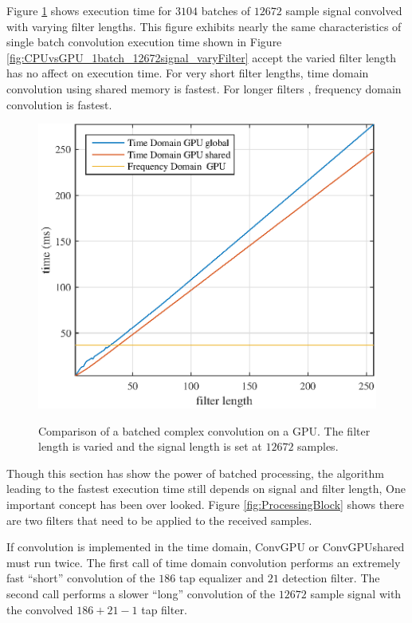Figure \ref{fig:CPUvsGPU_3104batch_12672signal_varyFilter} shows execution time for $3104$ batches of $12672$ sample signal convolved with varying filter lengths.
This figure exhibits nearly the same characteristics of single batch convolution execution time shown in Figure \ref{fig:CPUvsGPU_1batch_12672signal_varyFilter} accept the varied filter length has no affect on execution time.
For very short filter lengths, time domain convolution using shared memory is fastest.
For longer filters , frequency domain convolution is fastest.
\begin{figure}
	\caption{Comparison of a batched complex convolution on a GPU. The filter length is varied and the signal length is set at $12672$ samples.}
	\centering\includegraphics[width=5in]{figures/gpu_intro/CPUvsGPU_3104batch_12672signal_varyFilter.eps}
	\label{fig:CPUvsGPU_3104batch_12672signal_varyFilter}
\end{figure}

Though this section has show the power of batched processing, the algorithm leading to the fastest execution time still depends on signal and filter length,
One important concept has been over looked.
Figure \ref{fig:ProcessingBlock} shows there are two filters that need to be applied to the received samples. 

If convolution is implemented in the time domain, ConvGPU or ConvGPUshared must run twice.
The first call of time domain convolution performs an extremely fast ``short'' convolution of the $186$ tap equalizer and $21$ detection filter.
The second call performs a slower ``long'' convolution of the $12672$ sample signal with the  convolved $186+21-1$ tap filter.

